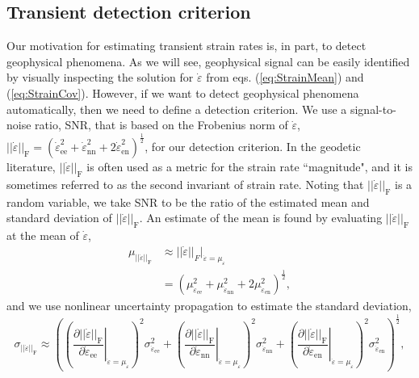 \documentclass[extra,mreferee]{gji}
\begin{document}
\subsection{Transient detection criterion}\label{sec:TransientDetection}
Our motivation for estimating transient strain rates is, in part, to detect geophysical phenomena. As we will see, geophysical signal can be easily identified by visually inspecting the solution for $\dot\varepsilon$ from eqs. (\ref{eq:StrainMean}) and (\ref{eq:StrainCov}). However, if we want to detect geophysical phenomena automatically, then we need to define a detection criterion. We use a signal-to-noise ratio, SNR, that is based on the Frobenius norm of $\dot\varepsilon$, $||\dot\varepsilon||_\mathrm{F} = \left(\dot\varepsilon_{\mathrm{ee}}^2 + \dot\varepsilon_{\mathrm{nn}}^2 + 2\dot\varepsilon_{\mathrm{en}}^2\right)^{\frac{1}{2}}$, for our detection criterion. In the geodetic literature, $||\dot{\varepsilon}||_\mathrm{F}$ is often used as a metric for the strain rate ``magnitude", and it is sometimes referred to as the second invariant of strain rate. Noting that $||\dot\varepsilon||_\mathrm{F}$ is a random variable, we take SNR to be the ratio of the estimated mean and standard deviation of $||\dot\varepsilon||_\mathrm{F}$. An estimate of the mean is found by evaluating $||\dot\varepsilon||_\mathrm{F}$ at the mean of $\dot\varepsilon$, 
\begin{align}
\mu_{||\dot\varepsilon||_\mathrm{F}} &\approx ||\dot\varepsilon||_F \big|_{\dot\varepsilon = \mu_{\dot\varepsilon}}\nonumber \\
                                     &= \left(\mu_{\dot\varepsilon_\mathrm{ee}}^2 + 
                                              \mu_{\dot\varepsilon_\mathrm{nn}}^2 + 
                                              2\mu_{\dot\varepsilon_\mathrm{en}}^2
                                     \right)^\frac{1}{2},
\end{align}
and we use nonlinear uncertainty propagation to estimate the standard deviation,
\begin{equation}
\sigma_{||\dot\varepsilon||_\mathrm{F}} \approx
\left(\left(\left. \frac{\partial ||\dot\varepsilon||_\mathrm{F}}{\partial \dot\varepsilon_\mathrm{ee}}\right|_{\dot\varepsilon = \mu_{\dot\varepsilon}} \right)^2 \sigma^2_{\dot\varepsilon_\mathrm{ee}} +
\left(\left. \frac{\partial ||\dot\varepsilon||_\mathrm{F}}{\partial \dot\varepsilon_\mathrm{nn}}\right|_{\dot\varepsilon = \mu_{\dot\varepsilon}} \right)^2 \sigma^2_{\dot\varepsilon_\mathrm{nn}} +
\left(\left. \frac{\partial ||\dot\varepsilon||_\mathrm{F}}{\partial \dot\varepsilon_\mathrm{en}}\right|_{\dot\varepsilon = \mu_{\dot\varepsilon}} \right)^2 \sigma^2_{\dot\varepsilon_\mathrm{en}}
\right)^\frac{1}{2},
\end{equation}
\end{document}
